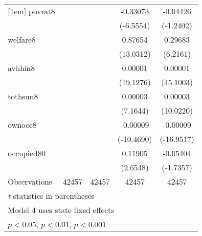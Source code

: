 \documentclass{article}
\begin{document}
{\begin{longtable}{l*{4}{c}}
[1em]
povrat8             &                     &                     &    -0.33073\sym{***}&    -0.04426         \\
                    &                     &                     &   (-6.5554)         &   (-1.2402)         \\
[1em]
welfare8            &                     &                     &     0.87654\sym{***}&     0.29683\sym{***}\\
                    &                     &                     &   (13.0312)         &    (6.2161)         \\
[1em]
avhhin8             &                     &                     &     0.00001\sym{***}&     0.00001\sym{***}\\
                    &                     &                     &   (19.1276)         &   (45.1003)         \\
[1em]
tothsun8            &                     &                     &     0.00003\sym{***}&     0.00003\sym{***}\\
                    &                     &                     &    (7.1644)         &   (10.0220)         \\
[1em]
ownocc8             &                     &                     &    -0.00009\sym{***}&    -0.00009\sym{***}\\
                    &                     &                     &  (-10.4690)         &  (-16.9517)         \\
[1em]
occupied80          &                     &                     &     0.11905\sym{**} &    -0.05404         \\
                    &                     &                     &    (2.6548)         &   (-1.7357)         \\
\hline
Observations        &       42457         &       42457         &       42457         &       42457         \\
\hline\hline
\multicolumn{5}{l}{\footnotesize \textit{t} statistics in parentheses}\\
\multicolumn{5}{l}{\footnotesize Model 4 uses state fixed effects }\\
\multicolumn{5}{l}{\footnotesize \sym{*} \(p<0.05\), \sym{**} \(p<0.01\), \sym{***} \(p<0.001\)}\\
\end{longtable}
}
\end{document}

